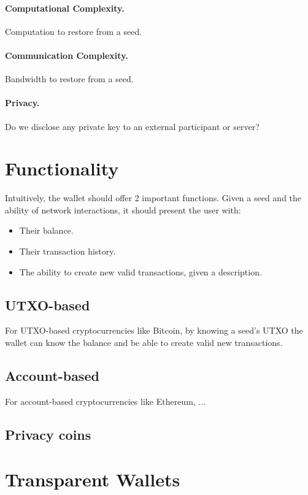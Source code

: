 \documentclass[sigconf]{acmart}
\begin{document}
\paragraph{Computational Complexity.} Computation to restore from a seed.
\paragraph{Communication Complexity.} Bandwidth to restore from a seed.
\paragraph{Privacy.} Do we disclose any private key to an external participant or server?

\section{Functionality}
Intuitively, the wallet should offer 2 important functions. Given a seed and the ability of network interactions, it should present the user with:

\begin{itemize}
    \item Their balance.
    \item Their transaction history.
    \item The ability to create new valid transactions, given a description.
\end{itemize}

\subsection{UTXO-based}
For UTXO-based cryptocurrencies like Bitcoin, by knowing a seed's UTXO the wallet can know the balance and be able to create valid new transactions.

\subsection{Account-based}
For account-based cryptocurrencies like Ethereum, ...

\subsection{Privacy coins}

\section{Transparent Wallets}
\end{document}

